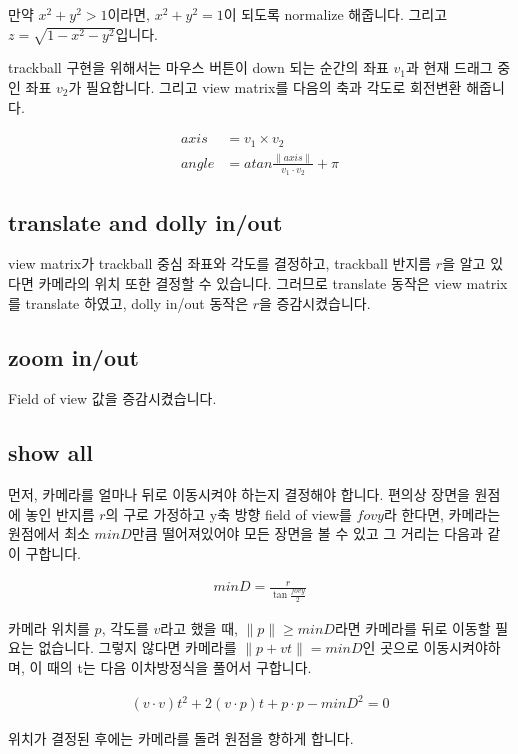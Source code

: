 \documentclass[11pt]{article}
\begin{document}
만약 $x^2+y^2>1$이라면, $x^2+y^2=1$이 되도록 normalize 해줍니다.
그리고 $z=\sqrt{1-x^2-y^2}$입니다.

trackball 구현을 위해서는 마우스 버튼이 down 되는 순간의 좌표 $v_1$과 현재 드래그 중인 좌표 $v_2$가 필요합니다.
그리고 view matrix를 다음의 축과 각도로 회전변환 해줍니다.

\begin{align*}
  axis &= v_1 \times v_2\\
  angle &= atan{\frac{\lVert axis \rVert}{v_1 \cdot v_2}} + \pi
\end{align*}

\subsection{translate and dolly in/out}

view matrix가 trackball 중심 좌표와 각도를 결정하고, trackball 반지름 $r$을 알고 있다면 카메라의 위치 또한 결정할 수 있습니다.
그러므로 translate 동작은 view matrix를 translate 하였고, dolly in/out 동작은 $r$을 증감시켰습니다.

\subsection{zoom in/out}

Field of view 값을 증감시켰습니다.

\subsection{show all}

먼저, 카메라를 얼마나 뒤로 이동시켜야 하는지 결정해야 합니다.
편의상 장면을 원점에 놓인 반지름 $r$의 구로 가정하고 y축 방향 field of view를 $fovy$라 한다면, 카메라는 원점에서 최소 $minD$만큼 떨어져있어야 모든 장면을 볼 수 있고 그 거리는 다음과 같이 구합니다.

\begin{align*}
  minD = \frac{r}{\tan{\frac{fovy}{2}}}
\end{align*}

카메라 위치를 $p$, 각도를 $v$라고 했을 때, $\lVert p \rVert \geq minD$라면 카메라를 뒤로 이동할 필요는 없습니다.
그렇지 않다면 카메라를 $\lVert p + vt \rVert = minD$인 곳으로 이동시켜야하며, 이 때의 t는 다음 이차방정식을 풀어서 구합니다.

\begin{align*}
  (v\cdot v)t^2+2(v\cdot p)t+p\cdot p-minD^2=0
\end{align*}

위치가 결정된 후에는 카메라를 돌려 원점을 향하게 합니다.
\end{document}
